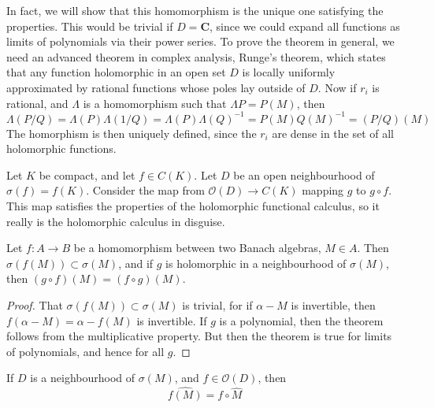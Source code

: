 In fact, we will show that this homomorphism is the unique one satisfying the properties. This would be trivial if $D = \mathbf{C}$, since we could expand all functions as limits of polynomials via their power series. To prove the theorem in general, we need an advanced theorem in complex analysis, Runge's theorem, which states that any function holomorphic in an open set $D$ is locally uniformly approximated by rational functions whose poles lay outside of $D$. Now if $r_i$ is rational, and $\Lambda$ is a homomorphism such that $\Lambda P = P(M)$, then
%
\[ \Lambda (P/Q) = \Lambda(P) \Lambda(1/Q) = \Lambda(P) \Lambda(Q)^{-1} = P(M) Q(M)^{-1} = (P/Q)(M) \]
%
The homorphism is then uniquely defined, since the $r_i$ are dense in the set of all holomorphic functions.

\begin{example}
    Let $K$ be compact, and let $f \in C(K)$. Let $D$ be an open neighbourhood of $\sigma(f) = f(K)$. Consider the map from $\mathcal{O}(D) \to C(K)$ mapping $g$ to $g \circ f$. This map satisfies the properties of the holomorphic functional calculus, so it really is the holomorphic calculus in disguise.
\end{example}

\begin{theorem}
    Let $f:A \to B$ be a homomorphism between two Banach algebras, $M \in A$. Then $\sigma(f(M)) \subset \sigma(M)$, and if $g$ is holomorphic in a neighbourhood of $\sigma(M)$, then $(g \circ f)(M) = (f \circ g)(M)$.
\end{theorem}
\begin{proof}
    That $\sigma(f(M)) \subset \sigma(M)$ is trivial, for if $\alpha - M$ is invertible, then $f(\alpha - M) = \alpha - f(M)$ is invertible. If $g$ is a polynomial, then the theorem follows from the multiplicative property. But then the theorem is true for limits of polynomials, and hence for all $g$.
\end{proof}

\begin{corollary}
    If $D$ is a neighbourhood of $\sigma(M)$, and $f \in \mathcal{O}(D)$, then
    \[ \widehat{f(M)} = f \circ \widehat{M} \]
\end{corollary}

